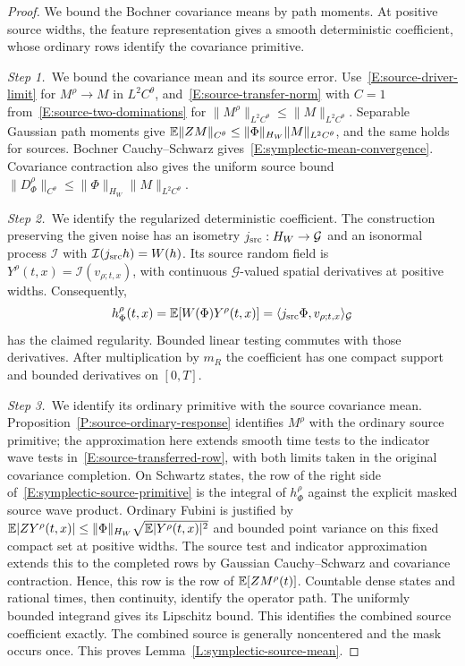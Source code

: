 \begin{proof}
  We bound the Bochner covariance means by path moments. At positive source
  widths, the feature representation gives a smooth deterministic coefficient,
  whose ordinary rows identify the covariance primitive.


  \medskip
  \noindent\textit{Step 1.~}We bound the covariance mean and its source error.
  Use~\eqref{E:source-driver-limit} for $M^\rho\to M$ in $L^2C^\theta$,
  and~\eqref{E:source-transfer-norm} with $C=1$
  from~\eqref{E:source-two-dominations} for
  $\|M^\rho\|_{L^2C^\theta}\le\|M\|_{L^2C^\theta}$.
  Separable Gaussian path moments give $\mathbb{E}\|ZM\|_{C^\theta} \le
  \|\Phi\|_{H_W}\|M\|_{L^2C^\theta}$, and the same holds for sources. Bochner
  Cauchy--Schwarz gives~\eqref{E:symplectic-mean-convergence}. Covariance
  contraction also gives the uniform source bound $\|D_\Phi^\rho\|_{C^\theta}
  \le \|\Phi\|_{H_W}\|M\|_{L^2C^\theta}$.


  \medskip
  \noindent\textit{Step 2.~}We identify the regularized deterministic
  coefficient.
  The construction preserving the given noise has an isometry $j_{\rm src}:H_W
  \to \mathcal{G}$ and an isonormal process $\mathcal{I}$ with
  $\mathcal{I}(j_{\rm src}h) = W(h)$. Its source random field is $Y^\rho(t,x) =
  \mathcal{I}(v_{\rho;t,x})$, with continuous $\mathcal{G}$-valued spatial
  derivatives at positive widths. Consequently,
  \[
    h_\Phi^\rho(t,x)=\mathbb{E}[W(\Phi)Y^\rho(t,x)]
    =\langle j_{\rm src}\Phi,v_{\rho;t,x}\rangle_{\mathcal{G}}
  \]
  has the claimed regularity. Bounded linear testing commutes with those
  derivatives. After multiplication by $m_R$ the coefficient has one compact
  support and bounded derivatives on $[0,T]$.


  \medskip
  \noindent\textit{Step 3.~}We identify its ordinary primitive with the source
  covariance mean.
  Proposition~\ref{P:source-ordinary-response} identifies $M^\rho$ with the
  ordinary source primitive; the approximation here extends smooth time tests
  to the indicator wave tests in~\eqref{E:source-transferred-row}, with both
  limits taken in the original covariance completion.
  On Schwartz states, the row of the right side
  of~\eqref{E:symplectic-source-primitive} is the integral of $h_\Phi^\rho$
  against the explicit masked source wave product. Ordinary Fubini is justified
  by $\mathbb{E}|ZY^\rho(t,x)| \le \|\Phi\|_{H_W} \sqrt{\mathbb{E}|Y^\rho(t,x)|^2}$ and bounded
  point variance on this fixed compact set at positive widths. The source test
  and indicator approximation extends this to the completed rows by Gaussian
  Cauchy--Schwarz and covariance contraction. Hence, this row is the row of
  $\mathbb{E}[ZM^\rho(t)]$. Countable dense states and rational times, then continuity,
  identify the operator path. The uniformly bounded integrand gives its
  Lipschitz bound. This identifies the combined source coefficient exactly. The
  combined source is generally noncentered and the mask occurs once. This proves
  Lemma~\ref{L:symplectic-source-mean}.
\end{proof}

